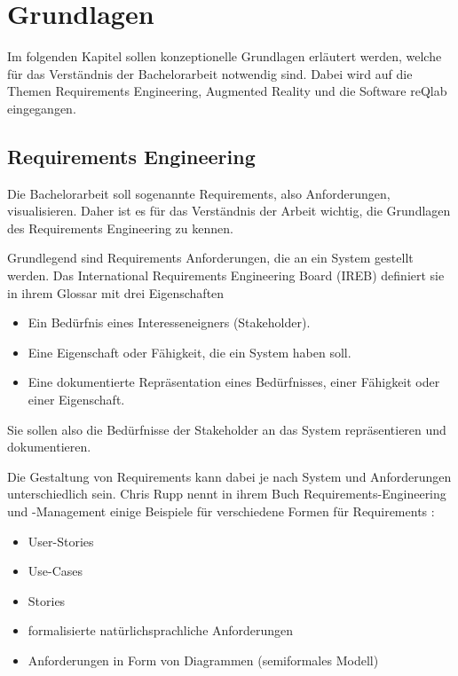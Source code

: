 \chapter{Grundlagen}

Im folgenden Kapitel sollen konzeptionelle Grundlagen erläutert werden, welche für das Verständnis der Bachelorarbeit notwendig sind.
Dabei wird auf die Themen Requirements Engineering, Augmented Reality und die Software reQlab eingegangen.

  \section{Requirements Engineering}
  Die Bachelorarbeit soll sogenannte Requirements, also Anforderungen, visualisieren.
  Daher ist es für das Verständnis der Arbeit wichtig, die Grundlagen des Requirements Engineering zu kennen.


    Grundlegend sind Requirements Anforderungen, die an ein System gestellt werden.
    Das International Requirements Engineering Board (IREB) definiert sie in ihrem Glossar mit drei Eigenschaften \autocite[][Def. Anforderung]{ireb_cpre_glossary}
    \begin{itemize}
        \item Ein Bedürfnis eines Interesseneigners (Stakeholder).
        \item Eine Eigenschaft oder Fähigkeit, die ein System haben soll.
        \item Eine dokumentierte Repräsentation eines Bedürfnisses, einer Fähigkeit oder einer Eigenschaft.
    \end{itemize}
    

    Sie sollen also die Bedürfnisse der Stakeholder an das System repräsentieren und dokumentieren.

    Die Gestaltung von Requirements kann dabei je nach System und Anforderungen unterschiedlich sein. Chris Rupp nennt in ihrem Buch \glqq{}Requirements-Engineering und -Management\grqq{} einige Beispiele für verschiedene Formen für Requirements \autocite[][S. 19]{Rupp2014}:
    \begin{itemize}
        \item User-Stories
        \item Use-Cases
        \item Stories
        \item formalisierte natürlichsprachliche Anforderungen
        \item Anforderungen in Form von Diagrammen (semiformales Modell)
    \end{itemize}

